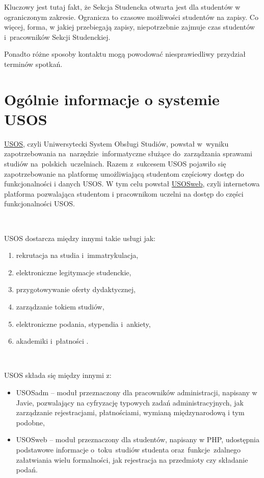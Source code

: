 \documentclass[licencjacka]{pracamgr}
\begin{document}
Kluczowy jest tutaj fakt, że Sekcja Studencka otwarta jest dla studentów w ograniczonym zakresie. Ogranicza to czasowe możliwości studentów na zapisy. Co więcej, forma, w jakiej przebiegają zapisy, niepotrzebnie zajmuje czas studentów i~pracowników Sekcji Studenckiej.

Ponadto różne sposoby kontaktu mogą powodować niesprawiedliwy przydział terminów spotkań.


\section{Ogólnie informacje o systemie USOS}
\href{http://usos.edu.pl}{USOS}, czyli Uniwersytecki System Obsługi Studiów, powstał w~wyniku zapotrzebowania na~narzędzie~informatyczne służące do~zarządzania sprawami studiów na~polskich~uczelniach. Razem z~sukcesem USOS pojawiło się zapotrzebowanie na platformę umożliwiającą studentom częściowy dostęp do funkcjonalności i danych USOS. W tym celu powstał \href{htpp://usosweb.uw.edu.pl}{USOSweb}, czyli internetowa platforma pozwalająca studentom i pracownikom uczelni na dostęp do części funkcjonalności USOS.

~~

USOS dostarcza między innymi takie usługi jak:
\begin{enumerate}
\item rekrutacja na studia i~immatrykulacja,
\item elektroniczne legitymacje studenckie,
\item przygotowywanie oferty dydaktycznej,
\item zarządzanie tokiem studiów,
\item elektroniczne podania, stypendia i~ankiety,
\item akademiki i~płatności \cite{usosstart}.
\end{enumerate}

~~

USOS składa się między innymi z:
\begin{itemize}
\item USOSadm -- moduł przeznaczony dla pracowników administracji, napisany w Javie, pozwalający na cyfryzację typowych zadań administracyjnych, jak zarządzanie rejestracjami, płatnościami, wymianą międzynarodową i tym podobne,
\item USOSweb -- moduł przeznaczony dla studentów, napisany w PHP, udostępnia podstawowe informacje o~toku~studiów studenta oraz~funkcje~zdalnego załatwiania wielu formalności, jak rejestracja na przedmioty czy składanie podań.
\end{itemize}
\end{document}
